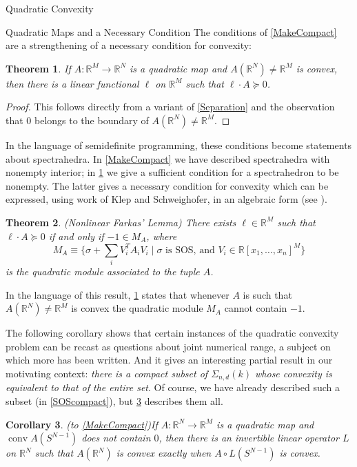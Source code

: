 \documentclass[12pt,oneside,final]{ucthesisucsbmath2010}
\newcommand{\R}{\mathbb{R}}
\newcommand{\snd}{\Sigma_{n,d}}
\DeclareMathOperator{\conv}{conv}
\newtheorem{thm}{Theorem}[section]
\newtheorem{cor}[thm]{Corollary}
\theoremstyle{definition}
\begin{document}
\begin{chapter}{Quadratic Convexity}
\begin{section}{Quadratic Maps and a Necessary Condition}
The conditions of \ref{MakeCompact} are a strengthening of a necessary condition for convexity:

\begin{thm}If $A: \R^M \to \R^N$ is a quadratic map and $A(\R^N) \neq \R^M$ is convex, then there is a linear functional $\ell$ on $\R^M$ such that $\ell \cdot A \succeq 0$.
\label{HalfPlane}
\end{thm}
\begin{proof}This follows directly from a variant of \ref{Separation} and the observation that $0$ belongs to the boundary of $A(\R^N) \neq \R^M$.\end{proof}
In the language of semidefinite programming, these conditions become statements about spectrahedra. In \ref{MakeCompact} we have described spectrahedra with nonempty interior; in \ref{HalfPlane} we give a sufficient condition for a spectrahedron to be nonempty. The latter gives a necessary condition for convexity which can be expressed, using work of Klep and Schweighofer, in an algebraic form (see \cite{KlepSchw}).

\begin{thm}(Nonlinear Farkas' Lemma) There exists $\ell \in \R^M$ such that $\ell \cdot A \succeq0$ if and only if $-1 \in M_A$, where
\[M_A \equiv \{ \sigma + \sum_i V_i^TA_iV_i \mid \sigma \text{ is SOS, and } V_i \in \R[x_1,\ldots,x_n]^M\}\]
is the quadratic module associated to the tuple $A$.
\end{thm} 

In the language of this result, \ref{HalfPlane} states that whenever $A$ is such that $A(\R^N) \neq \R^M$ is convex the quadratic module $M_A$ cannot contain $-1$.

The following corollary shows that certain instances of the quadratic convexity problem can be recast as questions about joint numerical range, a subject on which more has been written. And it gives an interesting partial result in our motivating context: \emph{there is a compact subset of $\snd(k)$ whose convexity is equivalent to that of the entire set}. Of course, we have already described such a subset (in \ref{SOScompact}), but  \ref{CorCompact} describes them all.

\begin{cor}(to \ref{MakeCompact})If $A : \R^N \to \R^M$ is a quadratic map and $\conv A(S^{N-1})$ does not contain $0$, then there is an invertible linear operator $L$ on $\R^N$ such that $A(\R^N)$ is convex exactly when $A \circ L(S^{N-1})$ is convex.
\label{CorCompact}
\end{cor}


\end{section}
\end{chapter}
\end{document}
